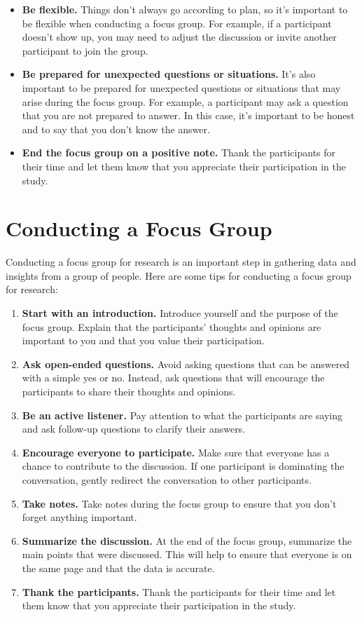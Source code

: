 \documentclass[
  b5paper]{book}
\begin{document}
\begin{itemize}
\item
  \textbf{Be flexible.} Things don't always go according to plan, so it's important to be flexible when conducting a focus group. For example, if a participant doesn't show up, you may need to adjust the discussion or invite another participant to join the group.
\item
  \textbf{Be prepared for unexpected questions or situations.} It's also important to be prepared for unexpected questions or situations that may arise during the focus group. For example, a participant may ask a question that you are not prepared to answer. In this case, it's important to be honest and to say that you don't know the answer.
\item
  \textbf{End the focus group on a positive note.} Thank the participants for their time and let them know that you appreciate their participation in the study.
\end{itemize}

\hypertarget{conducting-a-focus-group}{%
\section*{Conducting a Focus Group}\label{conducting-a-focus-group}}

Conducting a focus group for research is an important step in gathering data and insights from a group of people. Here are some tips for conducting a focus group for research:

\begin{enumerate}
\def\labelenumi{\arabic{enumi}.}
\item
  \textbf{Start with an introduction.} Introduce yourself and the purpose of the focus group. Explain that the participants' thoughts and opinions are important to you and that you value their participation.
\item
  \textbf{Ask open-ended questions.} Avoid asking questions that can be answered with a simple yes or no. Instead, ask questions that will encourage the participants to share their thoughts and opinions.
\item
  \textbf{Be an active listener.} Pay attention to what the participants are saying and ask follow-up questions to clarify their answers.
\item
  \textbf{Encourage everyone to participate.} Make sure that everyone has a chance to contribute to the discussion. If one participant is dominating the conversation, gently redirect the conversation to other participants.
\item
  \textbf{Take notes.} Take notes during the focus group to ensure that you don't forget anything important.
\item
  \textbf{Summarize the discussion.} At the end of the focus group, summarize the main points that were discussed. This will help to ensure that everyone is on the same page and that the data is accurate.
\item
  \textbf{Thank the participants.} Thank the participants for their time and let them know that you appreciate their participation in the study.
\end{enumerate}
\end{document}
